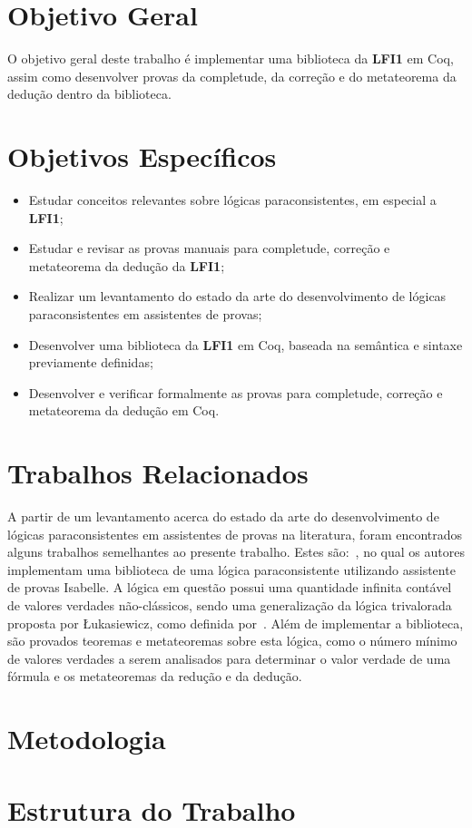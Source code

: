     \section{Objetivo Geral}
    O objetivo geral deste trabalho é implementar uma biblioteca da \textbf{LFI1} em Coq, assim como desenvolver provas da completude, da correção e do metateorema da dedução dentro da biblioteca.


    \section{Objetivos Específicos}
    \begin{itemize}
        \item Estudar conceitos relevantes sobre lógicas paraconsistentes, em especial a \textbf{LFI1};
        \item Estudar e revisar as provas manuais para completude, correção e metateorema da dedução da \textbf{LFI1};
        \item Realizar um levantamento do estado da arte do desenvolvimento de lógicas paraconsistentes em assistentes de provas;
        \item Desenvolver uma biblioteca da \textbf{LFI1} em Coq, baseada na semântica e sintaxe previamente definidas;
        \item Desenvolver e verificar formalmente as provas para completude, correção e metateorema da dedução em Coq.
    \end{itemize}


    \section{Trabalhos Relacionados}
    A partir de um levantamento acerca do estado da arte do desenvolvimento de lógicas paraconsistentes em assistentes de provas na literatura, foram encontrados alguns trabalhos semelhantes ao presente trabalho. Estes são:~\cite{Villadsen2017}, no qual os autores implementam uma biblioteca de uma lógica paraconsistente utilizando assistente de provas Isabelle. A lógica em questão possui uma quantidade infinita contável de valores verdades não-clássicos, sendo uma generalização da lógica trivalorada proposta por {\L}ukasiewicz, como definida por~. Além de implementar a biblioteca, são provados teoremas e metateoremas sobre esta lógica, como o número mínimo de valores verdades a serem analisados para determinar o valor verdade de uma fórmula e os metateoremas da redução e da dedução.


    \section{Metodologia}
        

    \section{Estrutura do Trabalho}
       